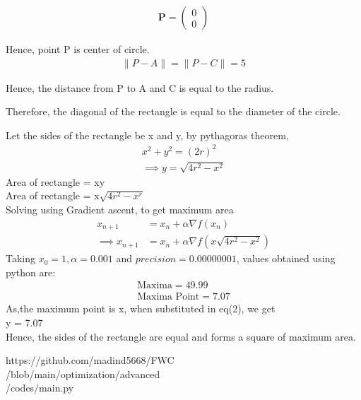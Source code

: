 \documentclass[a4,10pt]{report}
\newcommand{\myvec}[1]{\ensuremath{\begin{pmatrix}#1\end{pmatrix}}}
\let\vec\mathbf
\begin{document}
\begin{multicols}{2}
\begin{gather*}
		\vec{P} = \myvec{0\\0}
	\end{gather*}
	\raggedright{Hence, point P is center of circle.}
	\begin{gather*}
 \| P-A \| = \| P-C \| = 5
	\end{gather*}
	\raggedright{Hence, the distance from P to A and C is equal to the radius.}\\
	\raggedright{Therefore, the diagonal of the rectangle is equal to the diameter of the circle.}\vspace{10mm}\\
	\raggedright{Let the sides of the rectangle be x and y, by pythagoras theorem,} 
	\begin{gather}
	x^2 + y^2 = (2r)^2\\
		\implies{y = \sqrt{4r^2 - x^2}}
	\end{gather}
	Area of rectangle = xy\vspace{2mm}\\
	Area of rectangle = x$\sqrt{4r^2-x^r}$\vspace{2mm}\\
Solving using Gradient ascent, to get maximum area
\begin{align*}
x_{n+1} &= x_n + \alpha \nabla f(x_n) \\
	\implies x_{n+1} &= x_n + \alpha \nabla f(x\sqrt{4r^2-x^2})
\end{align*}
Taking $x_0 = 1, \alpha = 0.001$ and $precision = 0.00000001$, values obtained using python are:
\begin{align}
\boxed{\text{Maxima} = 49.99} \\
\boxed{\text{Maxima Point} = 7.07}
\end{align}
	As,the maximum point is x, when substituted in eq(2), we get\\
	\centering y = 7.07\\
Hence, the sides of the rectangle are equal and forms a square of maximum area.
\vspace{5mm}\\
\begin{mdframed}
\raggedright\large{https://github.com/madind5668/FWC\\/blob/main/optimization/advanced\\/codes/main.py}
\end{mdframed}
\end{multicols}
\end{document}
